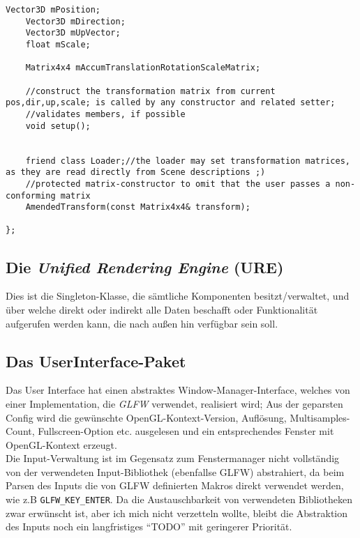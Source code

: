 \begin{lstlisting}[caption={AmenededTransform Klassendefinition, gekürzt},label=listing:AmendedTransformDef]
	Vector3D mPosition;
	Vector3D mDirection;
	Vector3D mUpVector;
	float mScale;
	
	Matrix4x4 mAccumTranslationRotationScaleMatrix;

	//construct the transformation matrix from current pos,dir,up,scale; is called by any constructor and related setter;
	//validates members, if possible
	void setup();


	friend class Loader;//the loader may set transformation matrices, as they are read directly from Scene descriptions ;)
	//protected matrix-constructor to omit that the user passes a non-conforming matrix	
	AmendedTransform(const Matrix4x4& transform);
	
};
 	\end{lstlisting}
 	
 	

    	
    	
    	
\subsection{Die \emph{Unified Rendering Engine} (URE)}
	Dies ist die Singleton-Klasse, die sämtliche Komponenten besitzt/verwaltet, und über welche direkt oder indirekt alle 
	Daten beschafft oder Funktionalität aufgerufen werden kann, die nach außen hin verfügbar sein soll.

\subsection{Das UserInterface-Paket}
	Das User Interface hat einen abstraktes Window-Manager-Interface, welches von einer Implementation, die \emph{GLFW} 	
	verwendet, realisiert wird;
	Aus der geparsten Config wird die gewünschte OpenGL-Kontext-Version, Auflösung, Multisamples-Count, Fullscreen-Option
	etc. ausgelesen und ein entsprechendes Fenster mit OpenGL-Kontext erzeugt.\\

	Die Input-Verwaltung ist im Gegensatz zum Fenstermanager nicht vollständig von der verwendeten Input-Bibliothek 	
	(ebenfallse GLFW) abstrahiert, da beim Parsen des Inputs die von GLFW definierten Makros direkt verwendet werden, 
	 wie z.B \lstinline|GLFW_KEY_ENTER|.
	Da die Austauschbarkeit von verwendeten Bibliotheken zwar erwünscht ist, aber ich mich nicht verzetteln wollte,
	bleibt die Abstraktion des Inputs noch ein langfristiges "`TODO"' mit geringerer Priorität.

